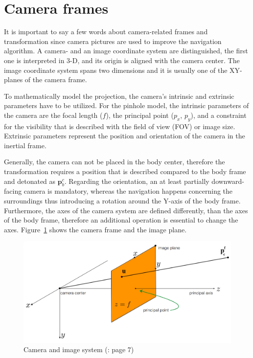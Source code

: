 \section{Camera frames}

It is important to say a few words about camera-related frames and transformation since camera pictures are used to improve the navigation algorithm. A camera- and an image coordinate system are distinguished, the first one is interpreted in 3-D, and its origin is aligned with the camera center. The image coordinate system spans two dimensions and it is usually one of the XY-planes of the camera frame. 

To mathematically model the projection, the camera's intrinsic and extrinsic parameters have to be utilized. For the pinhole model, the intrinsic parameters of the camera are the focal length ($f$), the principal point ($p_x$, $p_y$), and a constraint for the visibility that is described with the field of view (FOV) or image size. Extrinsic parameters represent the position and orientation of the camera in the inertial frame.

Generally, the camera can not be placed in the body center, therefore the transformation requires a position that is described compared to the body frame and detonated as $\mathbf{p}_{b}^c$. Regarding the orientation, an at least partially downward-facing camera is mandatory, whereas the navigation happens concerning the surroundings thus introducing a rotation around the Y-axis of the body frame. Furthermore, the axes of the camera system are defined differently, than the axes of the body frame, therefore an additional operation is essential to change the axes. Figure~\ref{fig:camera-system} shows the camera frame and the image plane. 

\begin{figure}[!ht]
    \centering
    \includegraphics[width=\textwidth]{figures/camera.png}
    \caption{Camera and image system (\cite{camera-matrix-slide}: page 7)}\label{fig:camera-system}
\end{figure}

